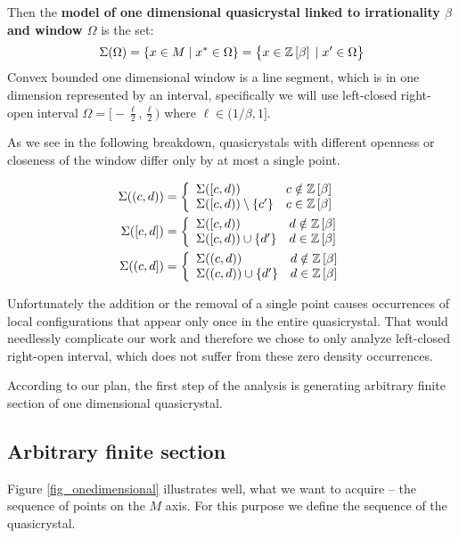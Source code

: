 \documentclass[text.tex]{subfiles}
\begin{document}
Then the \textbf{model of one dimensional quasicrystal linked to irrationality $\beta$ and window $\Omega$} is the set:
$$\Sigma(\Omega) = \{ x \in M\; |\; x^\ast\in \Omega\} = \big\{ x \in \mathbb{Z}\left[\beta\right]\; |\; x'\in \Omega\big\}$$
Convex bounded one dimensional window is a line segment, which is in one dimension represented by an interval, specifically we will use left-closed right-open interval $\Omega = \big[-\frac{\ell}{2}, \frac{\ell}{2}\big)$ where $\ell\in (1/\beta,1]$. 

As we see in the following breakdown, quasicrystals with different openness or closeness of the window differ only by at most a single point. 

\begin{align*}
\Sigma((c,d)) &= \left\{ 
	\begin{array}{l l}
	\Sigma([c,d)) & c \notin \mathbb{Z}\left[\beta\right]\\
	\Sigma([c,d))\setminus\{c'\} & c \in \mathbb{Z}\left[\beta\right]
	\end{array} \right. 
  \\
  \Sigma([c,d]) &= \left\{ 
	\begin{array}{l l}
	\Sigma([c,d)) & d \notin \mathbb{Z}\left[\beta\right]\\
	\Sigma([c,d))\cup\{d'\} & d \in \mathbb{Z}\left[\beta\right]
	\end{array} \right.
  \\
\Sigma((c,d]) &= \left\{ 
	\begin{array}{l l}
	\Sigma((c,d)) & d \notin \mathbb{Z}\left[\beta\right]\\
	\Sigma((c,d))\cup\{d'\} & d \in \mathbb{Z}\left[\beta\right]
	\end{array} \right.\\
\end{align*}

Unfortunately the addition or the removal of a single point causes occurrences of local configurations that appear only once in the entire quasicrystal. That would needlessly complicate our work and therefore we chose to only analyze left-closed right-open interval, which does not suffer from these zero density occurrences. 

According to our plan, the first step of the analysis is generating arbitrary finite section of one dimensional quasicrystal. 

\subsection{Arbitrary finite section}\label{sec_1DfiniteSection}
Figure \ref{fig_onedimensional} illustrates well, what we want to acquire -- the sequence of points on the $M$ axis. For this purpose we define the sequence of the quasicrystal. 
\end{document}
